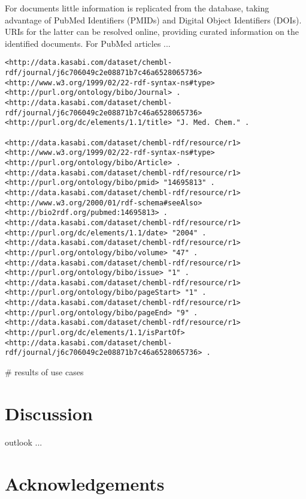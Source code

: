 \documentclass[sw]{iosart2c}
\begin{document}
For documents little information is replicated from the database, taking advantage
of PubMed Identifiers (PMIDs) and Digital Object Identifiers (DOIs). URIs for the
latter can be resolved online, providing curated information on the identified
documents. For PubMed articles ...

\begin{tiny}
\begin{verbatim}
<http://data.kasabi.com/dataset/chembl-rdf/journal/j6c706049c2e08871b7c46a6528065736> <http://www.w3.org/1999/02/22-rdf-syntax-ns#type> <http://purl.org/ontology/bibo/Journal> .
<http://data.kasabi.com/dataset/chembl-rdf/journal/j6c706049c2e08871b7c46a6528065736> <http://purl.org/dc/elements/1.1/title> "J. Med. Chem." .

<http://data.kasabi.com/dataset/chembl-rdf/resource/r1> <http://www.w3.org/1999/02/22-rdf-syntax-ns#type> <http://purl.org/ontology/bibo/Article> .
<http://data.kasabi.com/dataset/chembl-rdf/resource/r1> <http://purl.org/ontology/bibo/pmid> "14695813" .
<http://data.kasabi.com/dataset/chembl-rdf/resource/r1> <http://www.w3.org/2000/01/rdf-schema#seeAlso> <http://bio2rdf.org/pubmed:14695813> .
<http://data.kasabi.com/dataset/chembl-rdf/resource/r1> <http://purl.org/dc/elements/1.1/date> "2004" .
<http://data.kasabi.com/dataset/chembl-rdf/resource/r1> <http://purl.org/ontology/bibo/volume> "47" .
<http://data.kasabi.com/dataset/chembl-rdf/resource/r1> <http://purl.org/ontology/bibo/issue> "1" .
<http://data.kasabi.com/dataset/chembl-rdf/resource/r1> <http://purl.org/ontology/bibo/pageStart> "1" .
<http://data.kasabi.com/dataset/chembl-rdf/resource/r1> <http://purl.org/ontology/bibo/pageEnd> "9" .
<http://data.kasabi.com/dataset/chembl-rdf/resource/r1> <http://purl.org/dc/elements/1.1/isPartOf> <http://data.kasabi.com/dataset/chembl-rdf/journal/j6c706049c2e08871b7c46a6528065736> .
\end{verbatim}
\end{tiny}

\# results of use cases

\section{Discussion}

outlook ...

\section{Acknowledgements}
\end{document}
